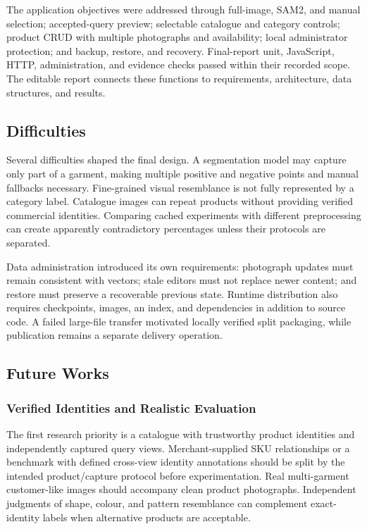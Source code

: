 The application objectives were addressed through full-image, SAM2, and manual
selection; accepted-query preview; selectable catalogue and category controls;
product CRUD with multiple photographs and availability; local administrator
protection; and backup, restore, and recovery. Final-report unit, JavaScript,
HTTP, administration, and evidence checks passed within their recorded scope.
The editable report connects these functions to requirements, architecture,
data structures, and results.

\subsection{Difficulties}
Several difficulties shaped the final design. A segmentation model may capture
only part of a garment, making multiple positive and negative points and manual
fallbacks necessary. Fine-grained visual resemblance is not fully represented
by a category label. Catalogue images can repeat products without providing
verified commercial identities. Comparing cached experiments with different
preprocessing can create apparently contradictory percentages unless their
protocols are separated.

Data administration introduced its own requirements: photograph updates must
remain consistent with vectors; stale editors must not replace newer content;
and restore must preserve a recoverable previous state. Runtime distribution
also requires checkpoints, images, an index, and dependencies in addition to
source code. A failed large-file transfer motivated locally verified split
packaging, while publication remains a separate delivery operation.

\subsection{Future Works}
\subsubsection{Verified Identities and Realistic Evaluation}
The first research priority is a catalogue with trustworthy product identities
and independently captured query views. Merchant-supplied SKU relationships or
a benchmark with defined cross-view identity annotations should be split by
the intended product/capture protocol before experimentation. Real multi-garment
customer-like images should accompany clean product photographs. Independent
judgments of shape, colour, and pattern resemblance can complement exact-identity
labels when alternative products are acceptable.

